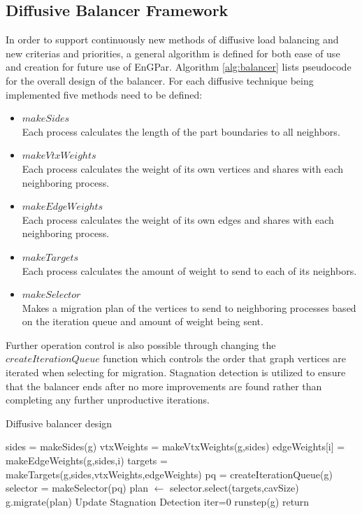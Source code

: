 \documentclass[a4paper]{article}
\begin{document}
\subsection{Diffusive Balancer Framework}
In order to support continuously new methods of diffusive load balancing and new criterias and priorities, a general algorithm is defined for both ease of use and creation for future use of EnGPar. Algorithm \ref{alg:balancer} lists pseudocode for the overall design of the balancer. For each diffusive technique being implemented five methods need to be defined:
\begin{itemize}
  \item $makeSides$\\
    Each process calculates the length of the part boundaries to all neighbors.
  \item $makeVtxWeights$ \\
    Each process calculates the weight of its own vertices and shares with each neighboring process.
  \item $makeEdgeWeights$ \\
    Each process calculates the weight of its own edges and shares with each neighboring process.
  \item $makeTargets$\\
    Each process calculates the amount of weight to send to each of its neighbors.
  \item $makeSelector$\\
    Makes a migration plan of the vertices to send to neighboring processes based on the iteration queue and amount of weight being sent.
\end{itemize}
Further operation control is also possible through changing the $createIterationQueue$ function which controls the order that graph vertices are iterated when selecting for migration. Stagnation detection is utilized to ensure that the balancer ends after no more improvements are found rather than completing any further unproductive iterations.

\begin{algorithm}
\caption{Diffusive balancer design}\label{alg:balancer}
\begin{algorithmic}
  \State sides = makeSides(g)
  \State vtxWeights = makeVtxWeights(g,sides)
  \State edgeWeights[i] = makeEdgeWeights(g,sides,i)
  \EndFor
  \State targets = makeTargets(g,sides,vtxWeights,edgeWeights)
  \State pq = createIterationQueue(g)
  \State selector = makeSelector(pq)
  \State plan $\leftarrow$ selector.select(targets,cavSize)
  \EndFor
  \State g.migrate(plan)
  \State Update Stagnation Detection
  \EndProcedure
  \State iter=0
  \State runstep(g)
  \State return
  \EndIf
  \EndFor
  \EndProcedure
\end{algorithmic}
\end{algorithm}
\end{document}
